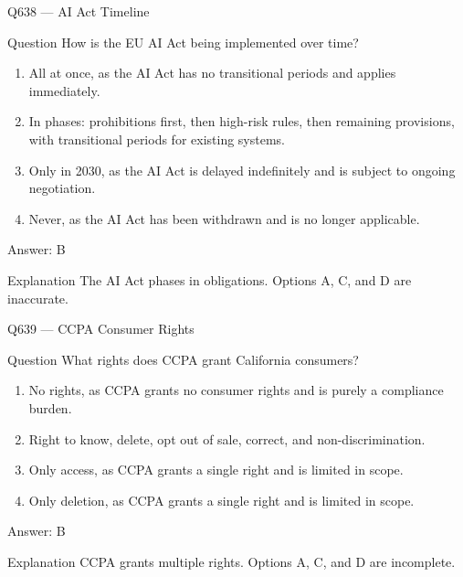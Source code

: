 \documentclass[aspectratio=169,8pt]{beamer}
\begin{document}
	\begin{frame}{Q638 --- AI Act Timeline}
		\begin{block}{Question}
			How is the EU AI Act being implemented over time?
			\begin{enumerate}
				\item All at once, as the AI Act has no transitional periods and applies immediately.
				\item In phases: prohibitions first, then high-risk rules, then remaining provisions, with transitional periods for existing systems.
				\item Only in 2030, as the AI Act is delayed indefinitely and is subject to ongoing negotiation.
				\item Never, as the AI Act has been withdrawn and is no longer applicable.
			\end{enumerate}
		\end{block}
		\begin{exampleblock}{Answer: B}\end{exampleblock}
		\begin{block}{Explanation}
			The AI Act phases in obligations. Options A, C, and D are inaccurate.
		\end{block}
	\end{frame}
	
	\begin{frame}{Q639 --- CCPA Consumer Rights}
		\begin{block}{Question}
			What rights does CCPA grant California consumers?
			\begin{enumerate}
				\item No rights, as CCPA grants no consumer rights and is purely a compliance burden.
				\item Right to know, delete, opt out of sale, correct, and non-discrimination.
				\item Only access, as CCPA grants a single right and is limited in scope.
				\item Only deletion, as CCPA grants a single right and is limited in scope.
			\end{enumerate}
		\end{block}
		\begin{exampleblock}{Answer: B}\end{exampleblock}
		\begin{block}{Explanation}
			CCPA grants multiple rights. Options A, C, and D are incomplete.
		\end{block}
	\end{frame}
	
\end{document}
